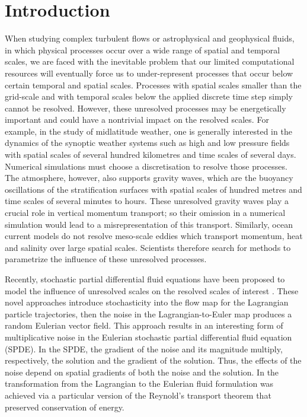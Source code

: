 \documentclass[12pt,onesided]{article}
\begin{document}
\section{Introduction}
When studying complex turbulent flows or astrophysical and geophysical fluids, in which physical processes occur over a wide range of spatial and temporal scales, we are faced with the inevitable problem that our limited computational resources will eventually force us to under-represent processes that occur below certain temporal and spatial scales. Processes with spatial scales smaller than the grid-scale and with temporal scales below the applied discrete time step simply  cannot be resolved. However, these unresolved processes may be energetically important and could have a nontrivial impact on the resolved scales. For example, in the study of midlatitude weather, one is generally interested in the dynamics of the synoptic weather systems such as high and low pressure fields with spatial scales of several hundred kilometres and time scales of several days. Numerical simulations must choose a discretisation to resolve those processes. The atmosphere, however, also supports gravity waves, which are the buoyancy oscillations of the stratification surfaces with spatial scales of hundred metres and time scales of several minutes to hours. These unresolved gravity waves play a crucial role in vertical momentum transport; so their omission in a numerical simulation would lead to a misrepresentation of this transport. Similarly, ocean current models do not resolve meso-scale eddies which transport momentum, heat and salinity over large spatial scales. Scientists therefore search for methods to parametrize the influence of these unresolved processes. 

Recently, stochastic partial differential fluid equations have been proposed to model the influence of unresolved scales on the resolved scales of interest \cite{Memin14,Holm15,ResseguierEtAl17a,ResseguierEtAl17b,ResseguierEtAl17c}. These novel approaches introduce stochasticity into the flow map for the Lagrangian particle trajectories, then the noise in the Lagrangian-to-Euler map produces a random Eulerian vector field. This approach results in an interesting form of multiplicative noise in the Eulerian stochastic partial differential fluid equation (SPDE). In the SPDE, the gradient of the noise and its magnitude multiply, respectively, the solution and the gradient of the solution. Thus, the effects of the noise depend on spatial gradients of both the noise and the solution. In \cite{Memin14,ResseguierEtAl17a,ResseguierEtAl17b,ResseguierEtAl17c} the transformation from the Lagrangian to the Eulerian fluid formulation was achieved via a particular version of the Reynold's transport theorem that preserved conservation of energy. 
\end{document}
